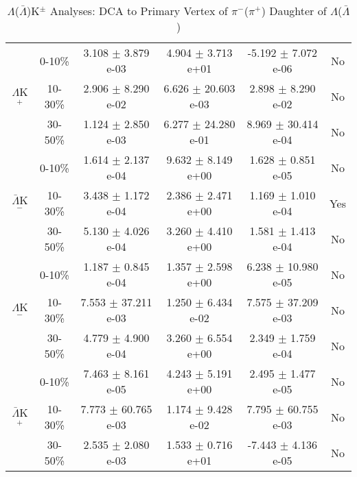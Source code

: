 \documentclass[../AnalysisNoteJBuxton.tex]{subfiles}
\begin{document}
\begin{table}
\begin{tabular}{|c|c|c|c|c|c|}
  \hline  
  \multirow{3}{*}{$\Lambda$K$^{+}$}   
   &  0-10\% & 3.108 $\pm$ 3.879 e-03 & 4.904 $\pm$ 3.713 e+01 & -5.192 $\pm$ 7.072 e-06 & No \\
   & 10-30\% & 2.906 $\pm$ 8.290 e-02 & 6.626 $\pm$ 20.603 e-03 & 2.898 $\pm$ 8.290 e-02 & No \\
   & 30-50\% & 1.124 $\pm$ 2.850 e-03 & 6.277 $\pm$ 24.280 e-01 & 8.969 $\pm$ 30.414 e-04 & No \\
  \hline  
  \multirow{3}{*}{$\bar{\Lambda}$K$^{-}$}
   & 0-10\% & 1.614 $\pm$ 2.137 e-04 & 9.632 $\pm$ 8.149 e+00 & 1.628 $\pm$ 0.851 e-05 & No \\
   & 10-30\% & 3.438 $\pm$ 1.172 e-04 & 2.386 $\pm$ 2.471 e+00 & 1.169 $\pm$ 1.010 e-04 & Yes \\
   & 30-50\% & 5.130 $\pm$ 4.026 e-04 & 3.260 $\pm$ 4.410 e+00 & 1.581 $\pm$ 1.413 e-04 & No \\
  \hline \hline
  \multirow{3}{*}{$\Lambda$K$^{-}$}   
   &  0-10\% & 1.187 $\pm$ 0.845 e-04 & 1.357 $\pm$ 2.598 e+00 & 6.238 $\pm$ 10.980 e-05 & No \\
   & 10-30\% & 7.553 $\pm$ 37.211 e-03 & 1.250 $\pm$ 6.434 e-02 & 7.575 $\pm$ 37.209 e-03 & No \\
   & 30-50\% & 4.779 $\pm$ 4.900 e-04 & 3.260 $\pm$ 6.554 e+00 & 2.349 $\pm$ 1.759 e-04 & No \\
  \hline  
  \multirow{3}{*}{$\bar{\Lambda}$K$^{+}$}
   & 0-10\% & 7.463 $\pm$ 8.161 e-05 & 4.243 $\pm$ 5.191 e+00 & 2.495 $\pm$ 1.477 e-05 & No \\
   & 10-30\% & 7.773 $\pm$ 60.765 e-03 & 1.174 $\pm$ 9.428 e-02 & 7.795 $\pm$ 60.755 e-03 & No \\
   & 30-50\% & 2.535 $\pm$ 2.080 e-03 & 1.533 $\pm$ 0.716 e+01 & -7.443 $\pm$ 4.136 e-05 & No \\  
  \hline
 \end{tabular}
 \caption{$\Lambda$($\bar{\Lambda}$)K$^{\pm}$ Analyses: DCA to Primary Vertex of $\pi^{-}$($\pi^{+}$) Daughter of $\Lambda$($\bar{\Lambda}$)}
 \label{tab:DcaToPrimVertexPionDaughtOfLamLamKchFull}
\end{table}
\end{document}
